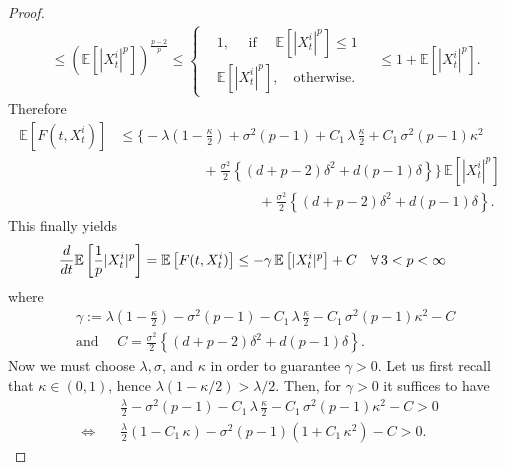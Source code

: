 \documentclass[10pt,a4paper]{amsart}
\newcommand{\rd}{{\rm d} }
\begin{document}
\begin{proof}
\begin{align*}
    & \leq \left(  \mathbb{E}\left[ |X^{i}_{t}|^{p}\right] \right)^{\frac{p-2}{p}} 
    \leq 
    \left\{
        \begin{aligned}
            & 1, \quad \text{ if }\quad \mathbb{E}\left[ |X^{i}_{t}|^{p} \right] \leq 1\\
            & \mathbb{E}\left[ |X^{i}_{t}|^{p} \right], \quad \text{otherwise.}
        \end{aligned}
    \right. \quad
    \leq 1 + \mathbb{E}\left[ |X^{i}_{t}|^{p}\right].
\end{align*}
Therefore 
\begin{align*}
    \mathbb{E}\left[F(t,X^{i}_{t}) \right]
    & \leq \bigg\{ -\lambda\left(1 -\frac{\kappa}{2}\right) + \sigma^{2}(p-1) + C_{1}\,\lambda\,\frac{\kappa}{2} + C_{1}\,\sigma^{2}(p-1)\kappa^{2}\\
    & \quad \quad \quad \quad \quad \quad + \frac{\sigma^{2}}{2}\left\{ (d+p-2)\delta^{2} + d(p-1)\delta\right\} \bigg\}\,\mathbb{E}\left[|X^{i}_{t}|^{p}\right]\\
    & \quad \quad \quad \quad \quad \quad \quad \quad \quad \quad + \frac{\sigma^{2}}{2}\left\{ (d+p-2)\delta^{2} + d(p-1)\delta\right\}.
\end{align*}
This finally yields
\begin{align*}
    \frac{\rd}{\rd t}\mathbb{E}\left[\frac{1}{p}|X^{i}_{t}|^{p}\right] & = \mathbb{E}\left[F(t,X^{i}_{t})\right]
     \leq -\gamma\,\mathbb{E}\left[|X_{t}^{i}|^{p}\right] + C \quad \forall\, 3<p<\infty
\end{align*}
where
\begin{align*}
    & \gamma :=  \lambda\left(1 -\frac{\kappa}{2}\right) - \sigma^{2}(p-1) - C_{1}\,\lambda\,\frac{\kappa}{2} - C_{1}\,\sigma^{2}(p-1)\kappa^{2} - C\\%
    & \text{and } \quad C = \frac{\sigma^{2}}{2}\left\{ (d+p-2)\delta^{2} + d(p-1)\delta\right\}.
\end{align*}
Now we must choose $\lambda,\sigma$, and $\kappa$ in order to guarantee $\gamma>0$. Let us first recall that $\kappa\in (0,1)$, hence $\lambda(1-\kappa/2)>\lambda/2$. Then, for $\gamma>0$ it suffices to have
\begin{align*}
    &  \frac{\lambda}{2} - \sigma^{2}(p-1) - C_{1}\,\lambda\,\frac{\kappa}{2} - C_{1}\,\sigma^{2}(p-1)\kappa^{2} - C >0\\
    \Leftrightarrow \quad & \frac{\lambda}{2}\left(1 -C_{1}\,\kappa\right) - \sigma^{2}(p-1)\left(1+C_{1}\,\kappa^{2}\right) - C >0.

\end{align*}
\end{proof}
\end{document}
